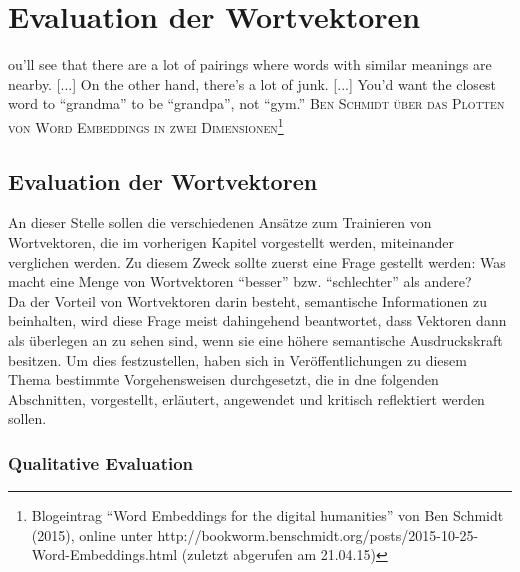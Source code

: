 
\chapter{Evaluation der Wortvektoren} %

\label{Chapter5} %


\begin{itquote}
[Y]ou’ll see that there are a lot of pairings where words with similar meanings are nearby. [...]
On the other hand, there’s a lot of junk. [...] You’d want the closest word to ``grandma'' to be ``grandpa'', not ``gym.''
\flushright
\textsc{Ben Schmidt über das Plotten von Word Embeddings in zwei Dimensionen\footnote{Blogeintrag ``Word Embeddings for the digital humanities'' von Ben Schmidt (2015),
online unter http://bookworm.benschmidt.org/posts/2015-10-25-Word-Embeddings.html (zuletzt abgerufen am 21.04.15)}}
\end{itquote}


\section{Evaluation der Wortvektoren}

An dieser Stelle sollen die verschiedenen Ansätze zum Trainieren von Wortvektoren, die im vorherigen Kapitel
vorgestellt werden, miteinander verglichen werden. Zu diesem Zweck sollte zuerst eine Frage gestellt werden:
Was macht eine Menge von Wortvektoren ``besser'' bzw. ``schlechter'' als andere?\\
Da der Vorteil von Wortvektoren darin besteht, semantische Informationen zu beinhalten, wird diese
Frage meist dahingehend beantwortet, dass Vektoren dann als überlegen an zu sehen sind, wenn sie
eine höhere semantische Ausdruckskraft besitzen. Um dies festzustellen, haben sich in Veröffentlichungen
zu diesem Thema bestimmte Vorgehensweisen durchgesetzt, die in dne folgenden Abschnitten, vorgestellt, erläutert,
angewendet und kritisch reflektiert werden sollen.\\

  \subsection{Qualitative Evaluation}

